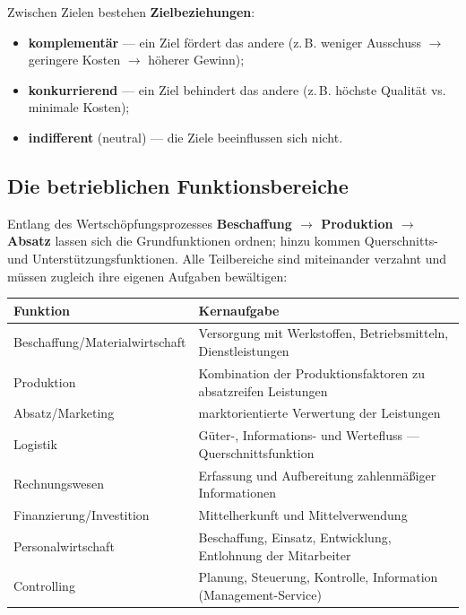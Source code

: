 \documentclass[11pt, a4paper]{article}
\begin{document}
Zwischen Zielen bestehen \textbf{Zielbeziehungen}:

\begin{itemize}
  \item \textbf{komplementär} --- ein Ziel fördert das andere (z.\,B. weniger Ausschuss
    $\rightarrow$ geringere Kosten $\rightarrow$ höherer Gewinn);
  \item \textbf{konkurrierend} --- ein Ziel behindert das andere (z.\,B. höchste Qualität
    vs. minimale Kosten);
  \item \textbf{indifferent} (neutral) --- die Ziele beeinflussen sich nicht.
\end{itemize}

\subsection{Die betrieblichen Funktionsbereiche}

Entlang des Wertschöpfungsprozesses \textbf{Beschaffung $\rightarrow$ Produktion
$\rightarrow$ Absatz} lassen sich die Grundfunktionen ordnen; hinzu kommen
Querschnitts- und Unterstützungsfunktionen. Alle Teilbereiche sind miteinander verzahnt
und müssen zugleich ihre eigenen Aufgaben bewältigen:

\begin{center}
\begin{tabular}{p{4.6cm} p{9.6cm}}
\textbf{Funktion} & \textbf{Kernaufgabe}\\
\hline
Beschaffung/Materialwirtschaft & Versorgung mit Werkstoffen, Betriebsmitteln, Dienstleistungen\\
Produktion & Kombination der Produktionsfaktoren zu absatzreifen Leistungen\\
Absatz/Marketing & marktorientierte Verwertung der Leistungen\\
Logistik & Güter-, Informations- und Wertefluss --- Querschnittsfunktion\\
Rechnungswesen & Erfassung und Aufbereitung zahlenmäßiger Informationen\\
Finanzierung/Investition & Mittelherkunft und Mittelverwendung\\
Personalwirtschaft & Beschaffung, Einsatz, Entwicklung, Entlohnung der Mitarbeiter\\
Controlling & Planung, Steuerung, Kontrolle, Information (Management-Service)\\
\end{tabular}
\end{center}
\end{document}
